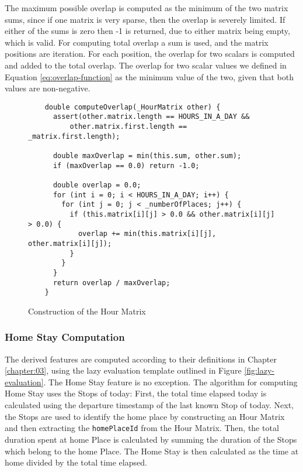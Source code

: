 The maximum possible overlap is computed as the minimum of the two matrix sums, since if one matrix is very sparse, then the overlap is severely limited. If either of the sums is zero then -1 is returned, due to either matrix being empty, which is valid. For computing total overlap a sum is used, and the matrix positions are iteration. For each position, the overlap for two scalars is computed and added to the total overlap. The overlap for two scalar values we defined in Equation \eqref{eq:overlap-function} as the minimum value of the two, given that both values are non-negative. 

\begin{figure}
    \centering
    \begin{verbatim}
    double computeOverlap(_HourMatrix other) {
      assert(other.matrix.length == HOURS_IN_A_DAY &&
          other.matrix.first.length == _matrix.first.length);
    
      double maxOverlap = min(this.sum, other.sum);
      if (maxOverlap == 0.0) return -1.0;
    
      double overlap = 0.0;
      for (int i = 0; i < HOURS_IN_A_DAY; i++) {
        for (int j = 0; j < _numberOfPlaces; j++) {
          if (this.matrix[i][j] > 0.0 && other.matrix[i][j] > 0.0) {
            overlap += min(this.matrix[i][j], other.matrix[i][j]);
          }
        }
      }
      return overlap / maxOverlap;
    }
    \end{verbatim}
    \caption{Construction of the Hour Matrix}
    \label{fig:hour-matrix-overlap}
\end{figure}


\subsubsection{Home Stay Computation}
The derived features are computed according to their definitions in Chapter \ref{chapter:03}, using the lazy evaluation template outlined in Figure \ref{fig:lazy-evaluation}. The Home Stay feature is no exception. The algorithm for computing Home Stay uses the Stops of today: First, the total time elapsed today is calculated using the departure timestamp of the last known Stop of today. Next, the Stops are used to identify the home place by constructing an Hour Matrix and then extracting the \verb|homePlaceId| from the Hour Matrix. Then, the total duration spent at home Place is calculated by summing the duration of the Stops which belong to the home Place. The Home Stay is then calculated as the time at home divided by the total time elapsed.

